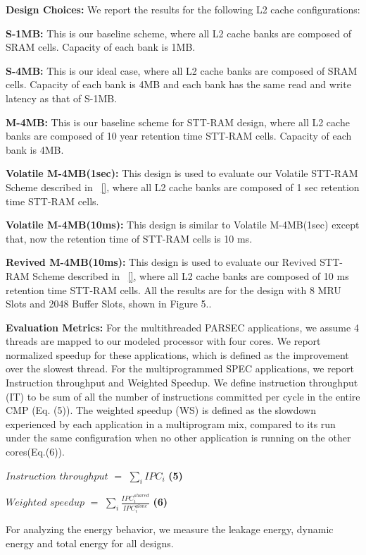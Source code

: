 \noindent\textbf{Design Choices:}
We report the results for the following L2 cache configurations:
\squishlist
\item {\bf S-1MB:} This is our baseline scheme, where all L2 cache banks are
composed of SRAM cells. Capacity of each bank  is 1MB.
\item {\bf S-4MB:} This is our ideal case, where all L2 cache banks
are composed of SRAM cells. Capacity of each bank is 4MB and each bank
has the same read and write latency as that of S-1MB.
\item {\bf M-4MB:} This is our baseline scheme for STT-RAM design, where
all L2 cache banks are composed of 10 year retention time STT-RAM cells.
Capacity of each bank is 4MB.
\item{\bf Volatile M-4MB(1sec):} This design is used to evaluate our
 Volatile STT-RAM Scheme described in ~\ref{}, where all L2 cache
banks are composed of 1 sec retention time STT-RAM cells.
\item {\bf Volatile M-4MB(10ms):} This design is similar to Volatile M-4MB(1sec)
except that, now the retention time of STT-RAM cells is 10 ms.
\item {\bf Revived M-4MB(10ms):} This design is used to evaluate our
 Revived STT-RAM Scheme described in ~\ref{}, where all L2 cache
banks are composed of 10 ms retention time STT-RAM cells. All the
results are for the design with 8 MRU Slots and 2048 Buffer Slots, shown in Figure 5..
\squishend

\noindent\textbf{ Evaluation Metrics:}
For the multithreaded PARSEC applications, we assume 4 threads are mapped to our modeled
processor with four cores. We report normalized speedup for these applications,
which is defined as the improvement over the slowest thread.
For the multiprogrammed SPEC applications, we report Instruction throughput and Weighted Speedup.
We define instruction throughput (IT) to be sum of all the number of instructions committed
per cycle in the entire CMP (Eq. (5)).  The weighted speedup (WS) is defined as the slowdown experienced
by each application in a multiprogram mix, compared to its run under the same
configuration when no other application is running on the other cores(Eq.(6)).

{
 $Instruction$ $throughput$ $=$ $\displaystyle\sum_{i} IPC_{i}$ \hspace{1mm} \textbf{(5)}

 $Weighted$ $speedup$ $=$ $\displaystyle\sum_{i}
\frac{IPC_{i}^{shared}}{IPC_{i}^{alone}}$ \hspace{1mm} \textbf{(6)}

}

For analyzing the energy behavior, we measure the leakage energy, dynamic energy and total energy for all designs.



